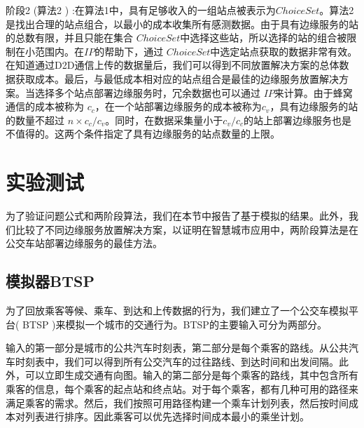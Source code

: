 
阶段2 (算法2 ) :在算法1中，具有足够收入的一组站点被表示为$ChoiceSet$。算法2是找出合理的站点组合，以最小的成本收集所有感测数据。由于具有边缘服务的站的总数有限，并且只能在集合 $ChoiceSet$中选择这些站，所以选择的站的组合被限制在小范围内。在$IP$的帮助下，通过 $ChoiceSet$中选定站点获取的数据非常有效。在知道通过D2D通信上传的数据量后，我们可以得到不同放置解决方案的总体数据获取成本。最后，与最低成本相对应的站点组合是最佳的边缘服务放置解决方案。当选择多个站点部署边缘服务时，冗余数据也可以通过 $IP$来计算。由于蜂窝通信的成本被称为 $c_c$，在一个站部署边缘服务的成本被称为$c_v$，具有边缘服务的站的数量不超过 $n\times c_c / c_v$。同时，在数据采集量小于$c_v/c_c$的站上部署边缘服务也是不值得的。这两个条件指定了具有边缘服务的站点数量的上限。

\section{实验测试}

为了验证问题公式和两阶段算法，我们在本节中报告了基于模拟的结果。此外，我们比较了不同边缘服务放置解决方案，以证明在智慧城市应用中，两阶段算法是在公交车站部署边缘服务的最佳方法。

\subsection{模拟器BTSP}


为了回放乘客等候、乘车、到达和上传数据的行为，我们建立了一个公交车模拟平台( BTSP )来模拟一个城市的交通行为。BTSP的主要输入可分为两部分。

输入的第一部分是城市的公共汽车时刻表，第二部分是每个乘客的路线。从公共汽车时刻表中，我们可以得到所有公交汽车的过往路线、到达时间和出发间隔。此外，可以立即生成交通有向图。输入的第二部分是每个乘客的路线，其中包含所有乘客的信息，每个乘客的起点站和终点站。对于每个乘客，都有几种可用的路径来满足乘客的需求。然后，我们按照可用路径构建一个乘车计划列表，然后按时间成本对列表进行排序。因此乘客可以优先选择时间成本最小的乘坐计划。

